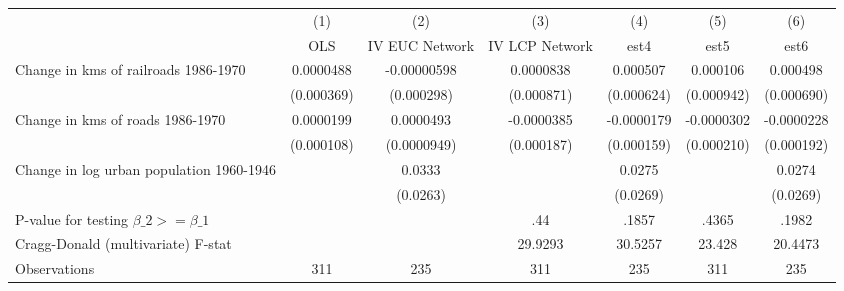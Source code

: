 {
\def\sym#1{\ifmmode^{#1}\else\(^{#1}\)\fi}
\begin{tabular}{l*{6}{c}}
\hline\hline
                &\multicolumn{1}{c}{(1)}&\multicolumn{1}{c}{(2)}&\multicolumn{1}{c}{(3)}&\multicolumn{1}{c}{(4)}&\multicolumn{1}{c}{(5)}&\multicolumn{1}{c}{(6)}\\
                &\multicolumn{1}{c}{OLS}&\multicolumn{1}{c}{IV EUC Network}&\multicolumn{1}{c}{IV LCP Network}&\multicolumn{1}{c}{est4}&\multicolumn{1}{c}{est5}&\multicolumn{1}{c}{est6}\\
\hline
Change in kms of railroads 1986-1970&0.0000488         &-0.00000598         &0.0000838         & 0.000507         & 0.000106         & 0.000498         \\
                &(0.000369)         &(0.000298)         &(0.000871)         &(0.000624)         &(0.000942)         &(0.000690)         \\
[1em]
Change in kms of roads 1986-1970&0.0000199         &0.0000493         &-0.0000385         &-0.0000179         &-0.0000302         &-0.0000228         \\
                &(0.000108)         &(0.0000949)         &(0.000187)         &(0.000159)         &(0.000210)         &(0.000192)         \\
[1em]
Change in log urban population 1960-1946&                  &   0.0333         &                  &   0.0275         &                  &   0.0274         \\
                &                  & (0.0263)         &                  & (0.0269)         &                  & (0.0269)         \\
\hline
P-value for testing $\beta\_{2} >= \beta\_{1}$&                  &                  &      .44         &    .1857         &    .4365         &    .1982         \\
Cragg-Donald (multivariate) F-stat&                  &                  &  29.9293         &  30.5257         &   23.428         &  20.4473         \\
Observations    &      311         &      235         &      311         &      235         &      311         &      235         \\
\hline\hline
\end{tabular}
}
